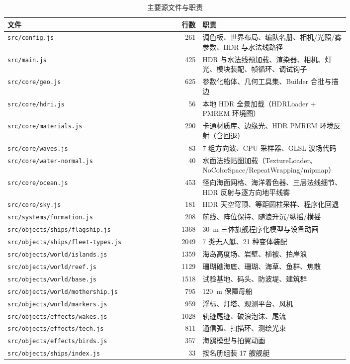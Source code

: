 \documentclass[UTF8, a4paper, 11pt]{ctexart}
\newcommand{\file}[1]{\texttt{#1}}
\begin{document}
\begin{table}[H]
\centering
\caption{主要源文件与职责}
\label{tab:files}
\small
\begin{tabular}{@{}p{0.375\linewidth}r p{0.43\linewidth}@{}}
\toprule
\textbf{文件} & \textbf{行数} & \textbf{职责} \\
\midrule
\file{src/config.js} & 261 & 调色板、世界布局、编队名册、相机/光照/雾参数、HDR 与水法线路径 \\
\file{src/main.js} & 425 & HDR 与水法线预加载、渲染器、相机、灯光、模块装配、帧循环、调试钩子 \\
\file{src/core/geo.js} & 625 & 参数化船体、几何工具集、Builder 合批与描边 \\
\file{src/core/hdri.js} & 56 & 本地 HDR 全景加载（HDRLoader + PMREM 环境图） \\
\file{src/core/materials.js} & 290 & 卡通材质库、边缘光、HDR PMREM 环境反射（含回退） \\
\file{src/core/waves.js} & 83 & 7 组方向波、CPU 采样器、GLSL 波场代码 \\
\file{src/core/water-normal.js} & 40 & 水面法线贴图加载（TextureLoader、NoColorSpace/RepeatWrapping/mipmap） \\
\file{src/core/ocean.js} & 453 & 径向海面网格、海洋着色器、三层法线细节、HDR 反射与逐方向地平线雾 \\
\file{src/core/sky.js} & 181 & HDR 天空穹顶、等距圆柱采样、程序化回退 \\
\file{src/systems/formation.js} & 208 & 航线、阵位保持、随浪升沉/纵摇/横摇 \\
\file{src/objects/ships/flagship.js} & 1368 & 30~m 三体旗舰程序化模型与设备动画 \\
\file{src/objects/ships/fleet-types.js} & 2049 & 7 类无人艇、21 种变体装配 \\
\file{src/objects/world/islands.js} & 1359 & 海岛高度场、岩壁、植被、拍岸浪 \\
\file{src/objects/world/reef.js} & 1129 & 珊瑚礁海底、珊瑚、海草、鱼群、焦散 \\
\file{src/objects/world/base.js} & 1518 & 试验基地、码头、防波堤、建筑群 \\
\file{src/objects/world/mothership.js} & 795 & 120~m 保障母船 \\
\file{src/objects/world/markers.js} & 959 & 浮标、灯塔、观测平台、风机 \\
\file{src/objects/effects/wakes.js} & 1028 & 轨迹尾迹、破浪泡沫、尾流 \\
\file{src/objects/effects/tech.js} & 811 & 通信弧、扫描环、测绘光束 \\
\file{src/objects/effects/birds.js} & 357 & 海鸥模型与拍翼动画 \\
\file{src/objects/ships/index.js} & 33 & 按名册组装 17 艘舰艇 \\
\bottomrule
\end{tabular}
\end{table}
\end{document}
